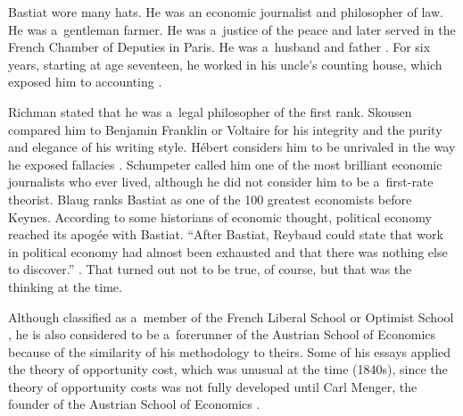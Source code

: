 Bastiat wore many hats. He was an economic journalist and philosopher of law. He was a~gentleman farmer. He was a~justice of the peace and later served in the French Chamber of Deputies in Paris. He was a~husband and father 
\parencites[][]{bidet_frederic_1906}[][]{bastiat_f_1889}[][]{haney_history_1949}[][]{imbert_frederic_1913}[][]{}[][]{roche_frederic_1971}[][]{roche_free_1993}[][]{ronce_frederic_1905}[][]{russell_frederic_1959}[][]{russell_frederic_1969}. %
 For six years, starting at age seventeen, he worked in his uncle's counting house, which exposed him to accounting 
\parencite[][p.xi]{bastiat_introduction_1964}.%




Richman 
\parencite*[][p.ix]{bastiat_foreward_1998} %
 stated that he was a~legal philosopher of the first rank. Skousen 
\parencite*[][p.59]{skousen_making_2001} %
 compared him to Benjamin Franklin or Voltaire for his integrity and the purity and elegance of his writing style. Hébert 
\parencite*[][p.205]{} %
 considers him to be unrivaled in the way he exposed fallacies 
\parencite[][p.59]{skousen_making_2001}. %
 Schumpeter 
\parencite*[][p.500]{schumpeter_history_1954} %
 called him one of the most brilliant economic journalists who ever lived, although he did not consider him to be a~first-rate theorist. Blaug 
\parencite*[][]{blaug_great_1986} %
 ranks Bastiat as one of the 100 greatest economists before Keynes. According to some historians of economic thought, political economy reached its apogée with Bastiat. ``After Bastiat, Reybaud could state that work in political economy had almost been exhausted and that there was nothing else to discover.'' 
\parencite[][p.2]{screpanti_outline_1993}. %
 That turned out not to be true, of course, but that was the thinking at the time.



Although classified as a~member of the French Liberal School or Optimist School 
\parencites[][pp.376–382]{cossa_introduction_1893}[][pp.329–354]{gide_history_1948}, %
 he is also considered to be a~forerunner of the Austrian School of Economics 
\parencite[][]{holcombe_frederic_1999} %
 because of the similarity of his methodology to theirs. Some of his essays applied the theory of opportunity cost, which was unusual at the time (1840s), since the theory of opportunity costs was not fully developed until Carl Menger, the founder of the Austrian School of Economics 
\parencite[][]{menger_grundsatze_1871}.%




